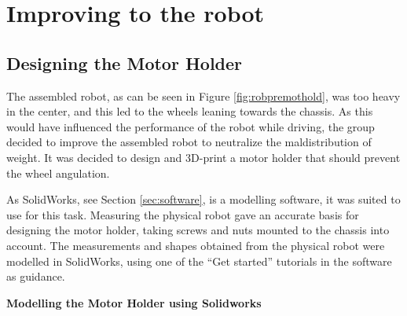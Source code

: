 \section{Improving to the robot}
\label{sec:improvements}

\subsection{Designing the Motor Holder}
The assembled robot, as can be seen in Figure \ref{fig:robpremothold}, was too heavy in the center, and this led to the wheels leaning towards the chassis. As this would have influenced the performance of the robot while driving, the group decided to improve the assembled robot to neutralize the maldistribution of weight. It was decided to design and 3D-print a motor holder that should prevent the wheel angulation.

As SolidWorks, see Section \ref{sec:software}, is a modelling software, it was suited to use for this task. Measuring the physical robot gave an accurate basis for designing the motor holder, taking screws and nuts mounted to the chassis into account. The measurements and shapes obtained from the physical robot were modelled in SolidWorks, using one of the ``Get started'' tutorials in the software as guidance.

\textbf{Modelling the Motor Holder using Solidworks}



